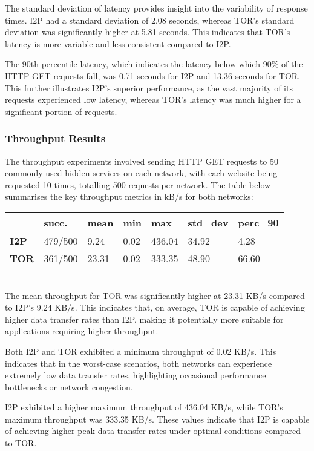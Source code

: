 \documentclass[12pt,conference]{IEEEtran}
\begin{document}
The standard deviation of latency provides insight into the variability of response times. I2P had a standard deviation of 2.08 seconds, whereas TOR's standard deviation was significantly higher at 5.81 seconds. This indicates that TOR's latency is more variable and less consistent compared to I2P.

The 90th percentile latency, which indicates the latency below which 90\% of the HTTP GET requests fall, was 0.71 seconds for I2P and 13.36 seconds for TOR. This further illustrates I2P's superior performance, as the vast majority of its requests experienced low latency, whereas TOR's latency was much higher for a significant portion of requests.

\subsubsection{Throughput Results} The throughput experiments involved sending HTTP GET requests to 50 commonly used hidden services on each network, with each website being requested 10 times, totalling 500 requests per network. The table below summarises the key throughput metrics in kB/s for both networks:
\begin{table}[h]
\begin{tabular}{lllllll}
\textbf{}    & \textbf{succ.} & \textbf{mean} & \textbf{min} & \textbf{max} & \textbf{std\_dev} & \textbf{perc\_90} \\ \hline
\textbf{I2P} & 479/500        & 9.24          & 0.02         & 436.04        & 34.92              & 4.28              \\
\textbf{TOR} & 361/500        & 23.31          & 0.02         & 333.35        & 48.90              & 66.60            
\end{tabular}
\end{table}
\\
The mean throughput for TOR was significantly higher at 23.31 KB/s compared to I2P's 9.24 KB/s. This indicates that, on average, TOR is capable of achieving higher data transfer rates than I2P, making it potentially more suitable for applications requiring higher throughput.

Both I2P and TOR exhibited a minimum throughput of 0.02 KB/s. This indicates that in the worst-case scenarios, both networks can experience extremely low data transfer rates, highlighting occasional performance bottlenecks or network congestion.

I2P exhibited a higher maximum throughput of 436.04 KB/s, while TOR's maximum throughput was 333.35 KB/s. These values indicate that I2P is capable of achieving higher peak data transfer rates under optimal conditions compared to TOR.
\end{document}
